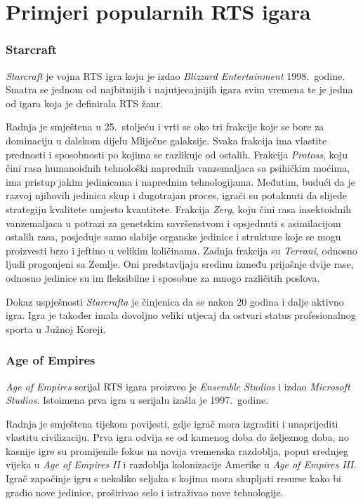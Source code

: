 \documentclass[times, utf8, zavrsni, numeric]{fer}
\begin{document}
\section{Primjeri popularnih RTS igara}

\subsubsection{Starcraft}
\par \textit{Starcraft} je vojna RTS igra koju je izdao \textit{Blizzard Entertainment} 1998.\ godine. 
Smatra se jednom od najbitnijih i najutjecajnijih igara svim vremena te je jedna od igara koja je definirala RTS žanr.

\par Radnja je smještena u 25.\ stoljeću i vrti se oko tri frakcije koje se bore za dominaciju u dalekom dijelu Mliječne galaksije. 
Svaka frakcija ima vlastite prednosti i sposobnosti po kojima se razlikuje od ostalih. 
Frakcija \textit{Protoss}, koju čini rasa humanoidnih tehnološki naprednih vanzemaljaca sa psihičkim moćima, ima pristup jakim jedinicama i naprednim tehnologijama.
Međutim, budući da je razvoj njihovih jedinica skup i dugotrajan proces, igrači su potaknuti da slijede strategiju kvalitete umjesto kvantitete.
Frakcija \textit{Zerg}, koju čini rasa insektoidnih vanzemaljaca u potrazi za genetskim savršenstvom i opsjednuti s asimilacijom ostalih rasa, posjeduje samo slabije organske jedinice i strukture koje se mogu proizvesti brzo i jeftino u velikim količinama.
Zadnja frakcija su \textit{Terrani}, odnosno ljudi progonjeni sa Zemlje.
Oni predstavljaju sredinu između prijašnje dvije rase, odnosno jedinice su im fleksibilne i sposobne za mnogo različitih poslova.

\par Dokaz uspješnosti \textit{Starcrafta} je činjenica da se nakon 20 godina i dalje aktivno igra.
Igra je također imala dovoljno veliki utjecaj da ostvari status profesionalnog sporta u Južnoj Koreji.

\subsubsection{Age of Empires}

\par \textit{Age of Empires} serijal RTS igara proizveo je \textit{Ensemble Studios} i izdao \textit{Microsoft Studios}. 
Istoimena prva igra u serijalu izašla je 1997.\ godine.

\par Radnja je smještena tijekom povijesti, gdje igrač mora izgraditi i unaprijediti vlastitu civilizaciju.
Prva igra odvija se od kamenog doba do željeznog doba, no kasnije igre su promijenile fokus na novija vremenska razdoblja, poput srednjeg vijeka u \textit{Age of Empires II} i razdoblja kolonizacije Amerike u \textit{Age of Empires III}.
Igrač započinje igru s nekoliko seljaka s kojima mora skupljati resurse kako bi gradio nove jedinice, proširivao selo i istraživao nove tehnologije.
\end{document}
